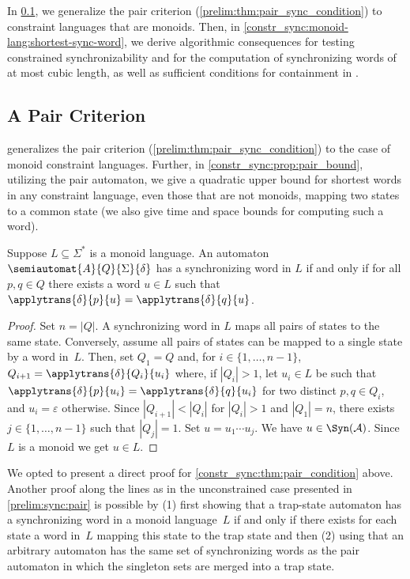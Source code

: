 

In \cref{constr_sync:sec:pair_aut},
we generalize the pair criterion (\cref{prelim:thm:pair_sync_condition})
to constraint languages that are monoids.
Then, in \cref{constr_sync:monoid-lang:shortest-sync-word}, we derive algorithmic consequences for testing constrained synchronizability and for the computation of synchronizing words of at most cubic length, as well as sufficient conditions for containment in \NL.

\subsection{A Pair Criterion}
\label{constr_sync:sec:pair_aut}

 generalizes the pair criterion (\cref{prelim:thm:pair_sync_condition})
to the case of monoid constraint languages.
Further, in \cref{constr_sync:prop:pair_bound}, utilizing the pair automaton,
we give a quadratic upper bound for shortest words in any constraint language, even those that are not monoids,
mapping two states to a common state (we also give time and space bounds for computing such a word).

\begin{theorem} 
	\label{constr_sync:thm:pair_condition}
	Suppose $L \subseteq \Sigma^*$ is a monoid language.
	An automaton $\semiautomat{A}{Q}{\Sigma}{\delta}$
	has a synchronizing word in $L$ if and only if
	for all $p, q \in Q$ there exists a word $u \in L$
	such that $\applytrans{\delta}{p}{u} = \applytrans{\delta}{q}{u}$.  
\end{theorem}
\begin{proof}
	Set $n = |Q|$. A synchronizing word in $L$
	maps all pairs of states to the same state.
    Conversely, assume all pairs of states can be mapped to a single state
	by a word in~$L$. 
	Then, set $Q_1 = Q$ and, for $i \in \{1,\ldots,n-1\}$,
	$Q_{i+1} = \applytrans{\delta}{Q_i}{u_i}$
	where, 	if $|Q_i| > 1$, let $u_i \in L$ be
	such that $\applytrans{\delta}{p}{u_i} = \applytrans{\delta}{q}{u_i}$
	for two distinct $p,q \in Q_i$, and $u_i = \varepsilon$ otherwise.
	Since $|Q_{i+1}| < |Q_i|$ for $|Q_i| > 1$ and $|Q_1| = n$, 
	there exists $j \in \{1,\ldots,n-1\}$ such that $|Q_j|=1$.
	Set $u = u_1 \cdots u_j$.
	We have $u \in \Syn(\mathcal A)$.
	Since $L$ is a monoid we get $u \in L$.
\end{proof}

\begin{remark}
	We opted to present a direct proof for \cref{constr_sync:thm:pair_condition} above.
	Another proof along the lines as in the unconstrained case presented in \cref{prelim:sync:pair}
	is possible
	by (1) first  showing that a trap-state automaton
	has a synchronizing word in a monoid language~$L$
	if and only if there exists for each state
	a word in~$L$ mapping this state to the trap state
	and then (2) using
	that an arbitrary automaton has the same
	set of synchronizing words as the pair automaton
	in which the singleton sets are merged into a trap state.	
\end{remark}

